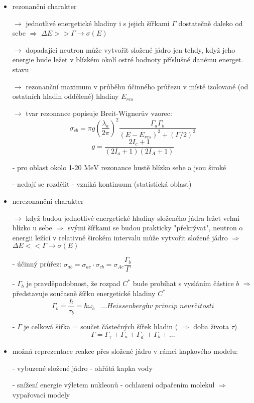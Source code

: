 \documentclass[../../main.tex]{subfiles}
\begin{document}
\begin{itemize}
	\item rezonanční charakter
	
	$\rightarrow$ jednotlivé energetické hladiny i s jejich šířkami $\Gamma$ dostatečně daleko od sebe $\Rightarrow$ $\Delta E >> \Gamma \rightarrow \sigma (E)$
	
	$\rightarrow$ dopadající neutron může vytvořit složené jádro jen tehdy, když jeho energie bude ležet v blízkém okolí ostré hodnoty příslušné danému energet. stavu
	
	$\rightarrow$ rezonanční maximum v průběhu účinného průřezu v místě izolované (od ostatních hladin oddělené) hladiny $E_{res}$
	
	$\rightarrow$ tvar rezonance popisuje Breit-Wignerův vzorec:
	\begin{equation}
	\sigma_{cb} = \pi g \left( \dfrac{\lambda _a}{2 \pi}\right)^2 \dfrac{\Gamma _a \Gamma_b}{(E - E_{res})^2 + (\Gamma /2)^2} 
	\end{equation}
	\begin{equation}
	g = \dfrac{2 I_c + 1}{(2 I_a + 1)(2 I_A + 1)}
	\end{equation}
	
- pro oblast okolo 1-20 $\mathrm{MeV}$ rezonance hustě blízko sebe a jsou široké 

- nedají se rozdělit - vzniká kontinuum (statistická oblast)

\item nerezonanční charakter

$\rightarrow$ když budou jednotlivé energetické hladiny složeného jádra ležet velmi blízko u sebe $\Rightarrow$ svými šířkami se budou prakticky "překrývat", neutron o energii ležící v relativně širokém intervalu může vytvořit složené jádro $\Rightarrow$ $\Delta E << \Gamma \rightarrow \sigma(E)$

- účinný průřez: $\sigma_{ab} = \sigma _{ac} \cdotp \sigma _{cb} = \sigma _{Ac} \dfrac{\Gamma_b }{\Gamma}$	

- $\Gamma_b$ je pravděpodobnost, že rozpad $C^{*}$ bude probíhat s vysláním částice $b$ $\Rightarrow$ představuje současně šířku energetické hladiny $C^{*}$
\begin{equation}
\Gamma_b = \dfrac{\hbar}{\tau _b} = \hbar \omega_b  ~~~~... \textit{Heissenbergův princip neurčitosti}
\end{equation}

- $\Gamma$ je celková šířka = součet částečných šířek hladin ( $\Rightarrow$ doba života $\tau$)
\begin{equation}
\Gamma = \Gamma_{\gamma} + \Gamma_a + \Gamma_{a^{'}} + \Gamma_b + ...
\end{equation}

\item možná reprezentace reakce přes složené jádro v rámci kapkového modelu:

- vybuzené složené jádro - ohřátá kapka vody

- snížení energie výletem nukleonů - ochlazení odpařením molekul $\Rightarrow$ vypařovací modely
\end{itemize}
\end{document}
